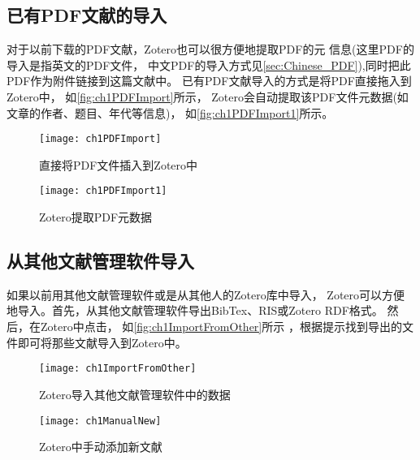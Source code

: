 \documentclass[cn,11pt,chinese]{elegantbook}
\begin{document}
	\subsection{已有PDF文献的导入} \label{sec:EngPDFIm}
	对于以前下载的PDF文献，Zotero也可以很方便地提取PDF的元
	信息(这里PDF的导入是指英文的PDF文件，
	中文PDF的导入方式见\cref{sec:Chinese_PDF}),同时把此PDF作为附件链接到这篇文献中。
	已有PDF文献导入的方式是将PDF直接拖入到Zotero中，
	如\autoref{fig:ch1PDFImport}所示，
	Zotero会自动提取该PDF文件元数据(如文章的作者、题目、年代等信息)，
	如\autoref{fig:ch1PDFImport1}所示。
	\begin{figure}[htbp]
		\centering
		\texttt{[image: ch1PDFImport]}
		\caption{直接将PDF文件插入到Zotero中}
		\label{fig:ch1PDFImport}
	\end{figure}
	\begin{figure}[htbp]
		\centering
		\texttt{[image: ch1PDFImport1]}
		\caption{Zotero提取PDF元数据}
		\label{fig:ch1PDFImport1}
	\end{figure}
	
	\subsection{从其他文献管理软件导入}\label{OtherRefSoft}
	如果以前用其他文献管理软件或是从其他人的Zotero库中导入，
	Zotero可以方便地导入。首先，从其他文献管理软件导出BibTex、RIS或Zotero RDF格式。
	然后，在Zotero中点击，
	如\autoref{fig:ch1ImportFromOther}所示
	，根据提示找到导出的文件即可将那些文献导入到Zotero中。
	\begin{figure}
		\centering
		\begin{minipage}[t]{\dimexpr0.5\textwidth-4em}
			\centering
			\texttt{[image: ch1ImportFromOther]}
			\caption{Zotero导入其他文献管理软件中的数据}
			\label{fig:ch1ImportFromOther}
		\end{minipage}	
		\hspace{1cm}
		\begin{minipage}[t]{\dimexpr0.5\textwidth-4em}
			\centering
			\texttt{[image: ch1ManualNew]}
			\caption{Zotero中手动添加新文献}
			\label{fig:ch1ManualNew}
		\end{minipage}	
	\end{figure}
\end{document}
